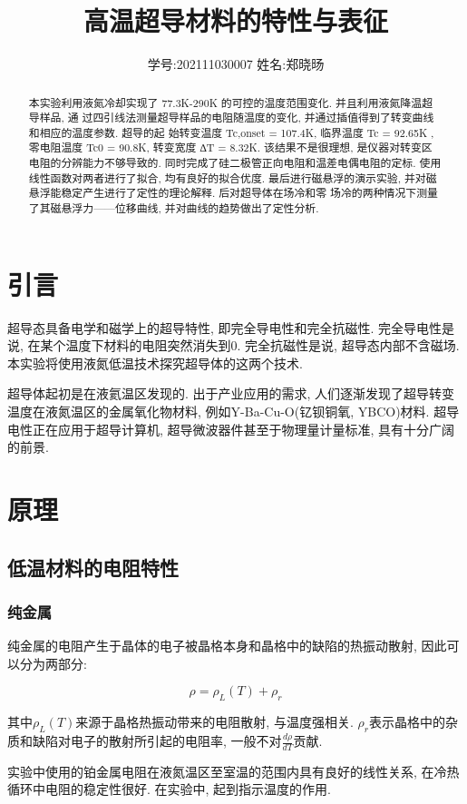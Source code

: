 \documentclass[12pt,a4paper]{article}
\title{\vspace{-4cm}\Large 高温超导材料的特性与表征}  %
\author{\kaishu 学号:202111030007 \hspace{2cm} 姓名:郑晓旸}   %
\date{}
\newcommand{\be}[1]{
    \begin{equation}
        #1
    \end{equation}
}
\begin{document}
\maketitle

\begin{abstract}
    本实验利用液氮冷却实现了 77.3K-290K 的可控的温度范围变化. 并且利用液氮降温超导样品, 通
    过四引线法测量超导样品的电阻随温度的变化, 并通过插值得到了转变曲线和相应的温度参数. 超导的起
    始转变温度 Tc,onset = 107.4K, 临界温度 Tc = 92.65K , 零电阻温度 Tc0 = 90.8K, 转变宽度 ∆T = 8.32K. 该结果不是很理想, 是仪器对转变区电阻的分辨能力不够导致的. 
    同时完成了硅二极管正向电阻和温差电偶电阻的定标. 使用线性函数对两者进行了拟合, 均有良好的拟合优度. 
    最后进行磁悬浮的演示实验, 并对磁悬浮能稳定产生进行了定性的理论解释. 后对超导体在场冷和零
    场冷的两种情况下测量了其磁悬浮力——位移曲线, 并对曲线的趋势做出了定性分析.
    
\end{abstract}

\section{引言}
超导态具备电学和磁学上的超导特性, 即完全导电性和完全抗磁性. 完全导电性是说, 在某个温度下材料的电阻突然消失到0. 完全抗磁性是说, 超导态内部不含磁场. 
本实验将使用液氮低温技术探究超导体的这两个技术. 

超导体起初是在液氦温区发现的. 出于产业应用的需求, 人们逐渐发现了超导转变温度在液氮温区的金属氧化物材料, 例如Y-Ba-Cu-O(钇钡铜氧, YBCO)材料. 超导电性正在应用于超导计算机, 超导微波器件甚至于物理量计量标准, 具有十分广阔的前景. 

\section{原理}
\subsection{低温材料的电阻特性}
\subsubsection{纯金属}
纯金属的电阻产生于晶体的电子被晶格本身和晶格中的缺陷的热振动散射, 因此可以分为两部分:
\be{\rho=\rho_{L}(T)+\rho_{r}}
其中$\rho_{L}(T)$来源于晶格热振动带来的电阻散射, 与温度强相关. $\rho_r$表示晶格中的杂质和缺陷对电子的散射所引起的电阻率, 一般不对$\frac{d\rho}{dT}$贡献. 

实验中使用的铂金属电阻在液氮温区至室温的范围内具有良好的线性关系, 在冷热循环中电阻的稳定性很好. 在实验中, 起到指示温度的作用. 
\end{document}
